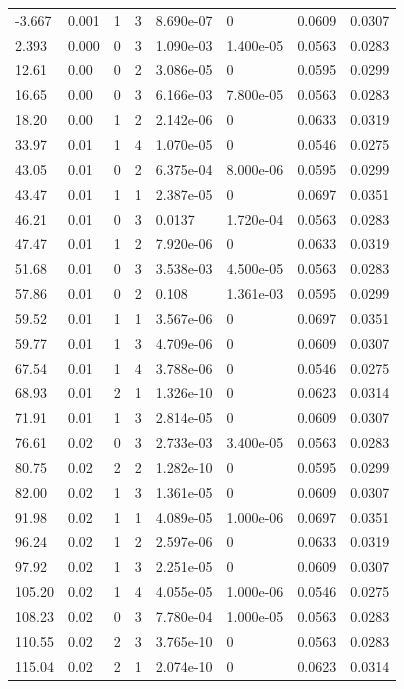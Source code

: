 \documentclass[preview]{standalone}
\begin{document}
{{\begin{tabular}{L{1.2cm}C{1.2cm} C{0.3cm}C{0.5cm} C{1.4cm}C{1.4cm} C{1.4cm}C{1.4cm}}
  -3.667  &  0.001  & 1     &  3 &  8.690e-07  & 0  & 0.0609 &  0.0307   \\ 
  2.393  &  0.000  & 0     &  3 &  1.090e-03  & 1.400e-05  & 0.0563 &  0.0283   \\ 
  12.61  &  0.00  & 0     &  2 &  3.086e-05  & 0  & 0.0595 &  0.0299   \\ 
  16.65  &  0.00  & 0     &  3 &  6.166e-03  & 7.800e-05  & 0.0563 &  0.0283   \\ 
  18.20  &  0.00  & 1     &  2 &  2.142e-06  & 0  & 0.0633 &  0.0319   \\ 
  33.97  &  0.01  & 1     &  4 &  1.070e-05  & 0  & 0.0546 &  0.0275   \\ 
  43.05  &  0.01  & 0     &  2 &  6.375e-04  & 8.000e-06  & 0.0595 &  0.0299   \\ 
  43.47  &  0.01  & 1     &  1 &  2.387e-05  & 0  & 0.0697 &  0.0351   \\ 
  46.21  &  0.01  & 0     &  3 &  0.0137  & 1.720e-04  & 0.0563 &  0.0283   \\ 
  47.47  &  0.01  & 1     &  2 &  7.920e-06  & 0  & 0.0633 &  0.0319   \\ 
  51.68  &  0.01  & 0     &  3 &  3.538e-03  & 4.500e-05  & 0.0563 &  0.0283   \\ 
  57.86  &  0.01  & 0     &  2 &  0.108  & 1.361e-03  & 0.0595 &  0.0299   \\ 
  59.52  &  0.01  & 1     &  1 &  3.567e-06  & 0  & 0.0697 &  0.0351   \\ 
  59.77  &  0.01  & 1     &  3 &  4.709e-06  & 0  & 0.0609 &  0.0307   \\ 
  67.54  &  0.01  & 1     &  4 &  3.788e-06  & 0  & 0.0546 &  0.0275   \\ 
  68.93  &  0.01  & 2     &  1 &  1.326e-10  & 0  & 0.0623 &  0.0314   \\ 
  71.91  &  0.01  & 1     &  3 &  2.814e-05  & 0  & 0.0609 &  0.0307   \\ 
  76.61  &  0.02  & 0     &  3 &  2.733e-03  & 3.400e-05  & 0.0563 &  0.0283   \\ 
  80.75  &  0.02  & 2     &  2 &  1.282e-10  & 0  & 0.0595 &  0.0299   \\ 
  82.00  &  0.02  & 1     &  3 &  1.361e-05  & 0  & 0.0609 &  0.0307   \\ 
  91.98  &  0.02  & 1     &  1 &  4.089e-05  & 1.000e-06  & 0.0697 &  0.0351   \\ 
  96.24  &  0.02  & 1     &  2 &  2.597e-06  & 0  & 0.0633 &  0.0319   \\ 
  97.92  &  0.02  & 1     &  3 &  2.251e-05  & 0  & 0.0609 &  0.0307   \\ 
  105.20  &  0.02  & 1     &  4 &  4.055e-05  & 1.000e-06  & 0.0546 &  0.0275   \\ 
  108.23  &  0.02  & 0     &  3 &  7.780e-04  & 1.000e-05  & 0.0563 &  0.0283   \\ 
  110.55  &  0.02  & 2     &  3 &  3.765e-10  & 0  & 0.0563 &  0.0283   \\ 
  115.04  &  0.02  & 2     &  1 &  2.074e-10  & 0  & 0.0623 &  0.0314   \\ 
\hline 
\end{tabular} 

}}
\end{document}
